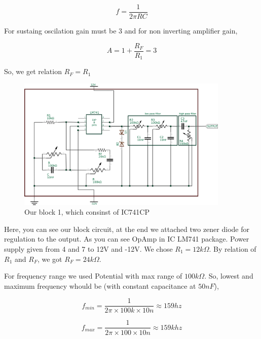 \documentclass[14pt,a4paper]{extarticle}
\begin{document}
\begin{equation}
\label{eq:orgb52580f}
  f =\frac{1}{2 \pi RC}
\end{equation}

For sustaing oscilation gain must be 3 and for non inverting amplifier gain, 

\begin{equation}
\label{eq:orgdf4f6d6}
  A = 1+\frac{R_{F}}{R_{1}} = 3
\end{equation}

So, we get relation \(R_{F}=R_{1}\)

\begin{figure}[ht]
    \centering
    \includegraphics[width=0.9\textwidth]{imgs/sinereal.png}
    \caption{Our block 1, which consinst of IC741CP}
    \label{fig:realsine}
\end{figure}


Here, you can see our block circuit, at the end we attached two zener diode for regulation to the output. As you can see OpAmp in IC LM741 package. Power supply given from  4 and 7 to 12V and -12V. We chose \(R_{1}=12k\Omega\). By relation of \(R_{1}\) and \(R_{F}\), we got \(R_{F}=24k\Omega\).

For frequency range we used Potential with max range of \(100k\Omega\). So, lowest and maximum frequency whould be (with constant capacitance at \(50nF\)),

\begin{equation*}
\label{eq:org813a37f}
  f_{min} = \frac{1}{2\pi\times100k\times 10n} \approx 159 hz
\end{equation*}

\begin{equation*}
\label{eq:org4cae3cc}
  f_{max} = \frac{1}{2\pi\times100\times 10n} \approx 159k hz
\end{equation*}
\end{document}

